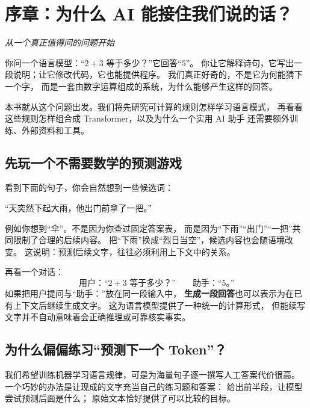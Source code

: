 \section*{序章：为什么 AI 能接住我们说的话？}

\begin{idea}
\noindent\emph{从一个真正值得问的问题开始}\par

你问一个语言模型：“$2+3$ 等于多少？”它回答“$5$”。
你让它解释诗句，它写出一段说明；让它修改代码，它也能提供程序。
我们真正好奇的，不是它为何能猜下一个字，
而是一套由数字运算组成的系统，为什么能够产生这样的回答。

本书就从这个问题出发。我们将先研究可计算的规则怎样学习语言模式，
再看看这些规则怎样组合成 Transformer，以及为什么一个实用 AI 助手
还需要额外训练、外部资料和工具。
\end{idea}

\subsection*{先玩一个不需要数学的预测游戏}

看到下面的句子，你会自然想到一些候选词：
\begin{center}
\begin{tcolorbox}[colback=paper,colframe=linegray,arc=2mm,boxrule=.6pt,
left=5mm,right=5mm,top=3mm,bottom=3mm]
“天突然下起大雨，他出门前拿了一把\underline{\hspace{12mm}}。”
\end{tcolorbox}
\end{center}
例如你想到“伞”。不是因为你查过固定答案表，
而是因为“下雨”“出门”“一把”共同限制了合理的后续内容。
把“下雨”换成“烈日当空”，候选内容也会随语境改变。
这说明：预测后续文字，往往必须利用上下文中的关系。

再看一个对话：
\[
\text{用户：“$2+3$ 等于多少？”}\qquad
\text{助手：“$5$。”}
\]
如果把用户提问与“助手：”放在同一段输入中，
\textbf{生成一段回答}也可以表示为在已有上下文后继续生成文字。
这为语言模型提供了一种统一的计算形式，
但能续写文字并不自动意味着会正确推理或可靠核实事实。

\subsection*{为什么偏偏练习“预测下一个 Token”？}

我们希望训练机器学习语言规律，可是为海量句子逐一撰写人工答案代价很高。
一个巧妙的办法是让现成的文字充当自己的练习题和答案：
给出前半段，让模型尝试预测后面是什么；
原始文本恰好提供了可以比较的目标。

